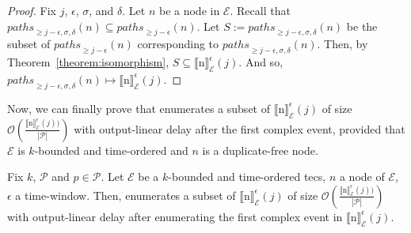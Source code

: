 \begin{proof}
  Fix $j$, $\epsilon$, $\sigma$, and $\delta$. Let $n$ be a node in $\mathcal{E}$. Recall that ${paths}_{\ge j-\epsilon, \sigma, \delta}(n) \subseteq {paths}_{\ge j-\epsilon}(n)$. Let $S := {paths}_{\ge j-\epsilon, \sigma, \delta}(n)$ be the subset of ${paths}_{\ge j-\epsilon}(n)$ corresponding to ${paths}_{\ge j-\epsilon, \sigma, \delta}(n)$. Then, by Theorem~\ref{theorem:isomorphism}, $S \subseteq {\llbracket \text{n} \rrbracket}^{\epsilon}_{\mathcal{E}}(j)$. And so, ${paths}_{\ge j-\epsilon, \sigma, \delta}(n) \mapsto {\llbracket \text{n} \rrbracket}^{\epsilon}_{\mathcal{E}}(j)$.
\end{proof}

Now, we can finally prove that  enumerates a subset of ${\llbracket \text{n} \rrbracket}^{\epsilon}_{\mathcal{E}}(j)$ of size $\mathcal{O}(\frac{{\llbracket \text{n} \rrbracket}^{\epsilon}_{\mathcal{E}}(j))}{|\mathcal{P}|})$ with output-linear delay after the first complex event, provided that $\mathcal{E}$ is $k$-bounded and time-ordered and $n$ is a duplicate-free node.

\begin{theorem}\label{theorem:enumeration:process}
  Fix $k$, $\mathcal{P}$ and $p \in \mathcal{P}$. Let $\mathcal{E}$ be a $k$-bounded and time-ordered \acrshort{tecs}, $n$ a node of $\mathcal{E}$, $\epsilon$ a time-window. Then,  enumerates a subset of ${\llbracket \text{n} \rrbracket}^{\epsilon}_{\mathcal{E}}(j)$ of size $\mathcal{O}(\frac{{\llbracket \text{n} \rrbracket}^{\epsilon}_{\mathcal{E}}(j))}{|\mathcal{P}|})$ with output-linear delay after enumerating the first complex event in ${\llbracket \text{n} \rrbracket}^{\epsilon}_{\mathcal{E}}(j)$.
\end{theorem}


